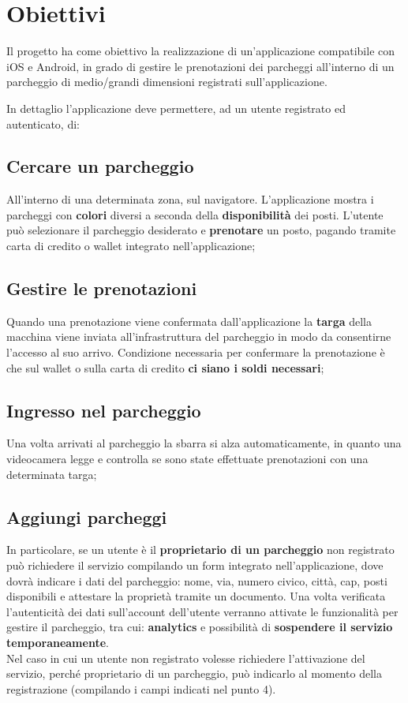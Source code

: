 \section{Obiettivi}
Il progetto ha come obiettivo la realizzazione di un'applicazione compatibile con iOS e Android, in grado di gestire le prenotazioni dei parcheggi all’interno di un parcheggio di medio/grandi dimensioni registrati sull’applicazione.

In dettaglio l’applicazione deve permettere, ad un utente registrato ed autenticato, di:

\subsection{Cercare un parcheggio}
    All’interno di una determinata zona, sul navigatore. L’applicazione mostra i parcheggi con \textbf{colori} diversi a seconda della \textbf{disponibilità} dei posti. L’utente può selezionare il parcheggio desiderato e \textbf{prenotare} un posto, pagando tramite carta di credito o wallet integrato nell'applicazione;
\subsection{Gestire le prenotazioni}
    Quando una prenotazione viene confermata dall’applicazione la \textbf{targa} della macchina viene inviata all'infrastruttura del parcheggio in modo da consentirne l’accesso al suo arrivo. Condizione necessaria per confermare la prenotazione è che sul wallet o sulla carta di credito \textbf{ci siano i soldi necessari};
\subsection{Ingresso nel parcheggio}
    Una volta arrivati al parcheggio la sbarra si alza automaticamente, in quanto una videocamera legge e controlla se sono state effettuate prenotazioni con una determinata targa;
\subsection{Aggiungi parcheggi}
    In particolare, se un utente è il \textbf{proprietario di un parcheggio} non registrato può richiedere il servizio compilando un form integrato nell’applicazione, dove dovrà indicare i dati del parcheggio: nome, via, numero civico, città, cap, posti disponibili e attestare la proprietà tramite un documento.
    Una volta verificata l’autenticità dei dati sull’account dell’utente verranno attivate le funzionalità per gestire il parcheggio, tra cui: \textbf{analytics} e possibilità di \textbf{sospendere il servizio temporaneamente}. \newline\\
Nel caso in cui un utente non registrato volesse richiedere l’attivazione del servizio, perché proprietario di un parcheggio, può indicarlo al momento della registrazione (compilando i campi indicati nel punto 4).